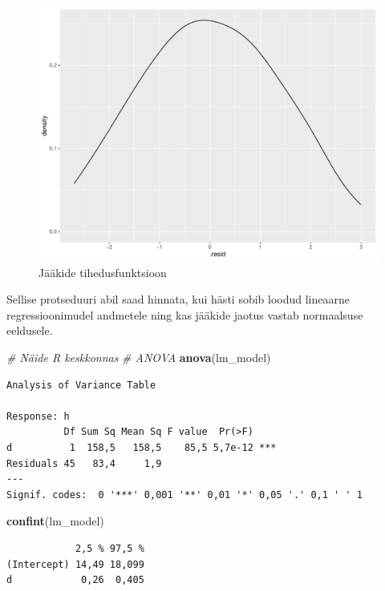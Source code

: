 \documentclass[
]{book}
\newenvironment{Shaded}{\begin{snugshade}}{\end{snugshade}}
\newcommand{\CommentTok}[1]{\textcolor[rgb]{0.56,0.35,0.01}{\textit{#1}}}
\newcommand{\FunctionTok}[1]{\textcolor[rgb]{0.13,0.29,0.53}{\textbf{#1}}}
\newcommand{\NormalTok}[1]{#1}
\renewenvironment{Shaded} {\begin{snugshade}\footnotesize} {\end{snugshade}}
\begin{document}
\begin{figure}
\includegraphics[width=0.8\linewidth]{_main_files/figure-latex/unnamed-chunk-66-1} \caption{Jääkide tihedusfunktsioon}\label{fig:unnamed-chunk-66}
\end{figure}

Sellise protseduuri abil saad hinnata, kui hästi sobib loodud lineaarne regressioonimudel andmetele ning kas jääkide jaotus vastab normaalsuse eeldusele.

\begin{Shaded}
\begin{Highlighting}[]
\CommentTok{\# Näide R keskkonnas}
\CommentTok{\# ANOVA}
\FunctionTok{anova}\NormalTok{(lm\_model)}
\end{Highlighting}
\end{Shaded}

\begin{verbatim}
Analysis of Variance Table

Response: h
          Df Sum Sq Mean Sq F value  Pr(>F)    
d          1  158,5   158,5    85,5 5,7e-12 ***
Residuals 45   83,4     1,9                    
---
Signif. codes:  0 '***' 0,001 '**' 0,01 '*' 0,05 '.' 0,1 ' ' 1
\end{verbatim}

\begin{Shaded}
\begin{Highlighting}[]
\FunctionTok{confint}\NormalTok{(lm\_model)}
\end{Highlighting}
\end{Shaded}

\begin{verbatim}
            2,5 % 97,5 %
(Intercept) 14,49 18,099
d            0,26  0,405
\end{verbatim}
\end{document}
